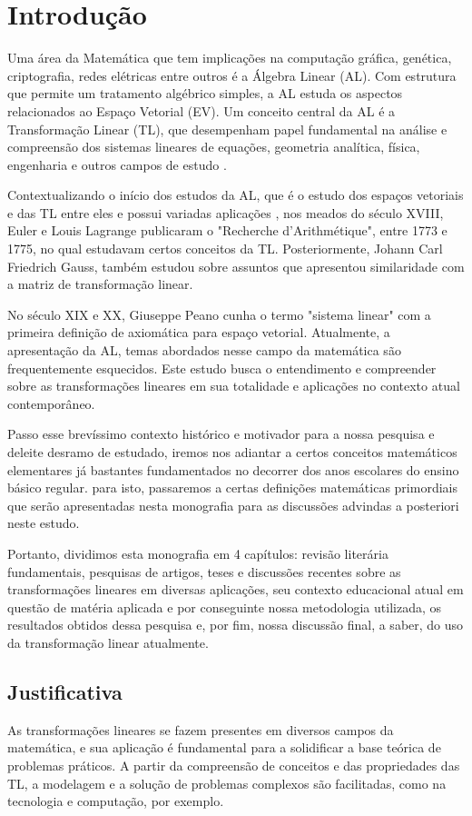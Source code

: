 \chapter{Introdução}
Uma área da Matemática que tem implicações na computação gráfica, genética, criptografia, redes elétricas entre outros é a Álgebra Linear (AL). Com estrutura que permite um tratamento algébrico simples, a AL estuda os aspectos relacionados ao Espaço Vetorial (EV). Um conceito central da AL é a Transformação Linear (TL), que desempenham papel fundamental na análise e compreensão dos sistemas lineares de equações, geometria analítica, física, engenharia e outros campos de estudo \cite{figueiredo2009}. 

Contextualizando o início dos estudos da AL, que é o estudo dos espaços vetoriais e das TL entre eles e possui variadas aplicações \cite{souzasilzaeliza2017}, nos meados do século XVIII, Euler e Louis Lagrange publicaram o "Recherche d'Arithmétique", entre 1773 e 1775, no qual estudavam certos conceitos da TL. Posteriormente, Johann Carl Friedrich Gauss, também estudou sobre assuntos que apresentou similaridade com a matriz de transformação linear.

No século XIX e XX, Giuseppe Peano cunha o termo "sistema linear" com a primeira definição de axiomática para espaço vetorial. Atualmente, a apresentação da AL, temas abordados nesse campo da matemática são frequentemente esquecidos. Este estudo busca o entendimento e compreender sobre as transformações lineares em sua totalidade e aplicações no contexto atual contemporâneo.

Passo esse brevíssimo contexto histórico e motivador para a nossa pesquisa e deleite desramo de estudado, iremos nos adiantar a certos conceitos matemáticos elementares já bastantes fundamentados no decorrer dos anos escolares do ensino básico regular. para isto, passaremos a certas definições matemáticas primordiais que serão apresentadas nesta monografia para as discussões advindas a posteriori neste estudo.

Portanto, dividimos esta monografia em 4 capítulos: revisão literária fundamentais, pesquisas de artigos, teses e discussões recentes sobre as transformações lineares em diversas aplicações, seu contexto educacional atual em questão de matéria aplicada e por conseguinte nossa metodologia utilizada, os resultados obtidos dessa pesquisa e, por fim, nossa discussão final, a saber, do uso da transformação linear atualmente.

\section{Justificativa}
As transformações lineares se fazem presentes em diversos campos da matemática, e sua aplicação é fundamental para a solidificar a base teórica de problemas práticos. A partir da compreensão de conceitos e das propriedades das TL, a modelagem e a solução de problemas complexos são facilitadas, como na tecnologia e computação, por exemplo. 

